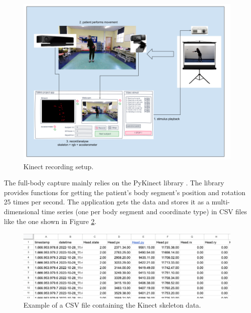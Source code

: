                     \begin{figure}[H]
                        \centering
                        \includegraphics[width=1.0\textwidth]{./resources/kinect/setup.png}
                        \caption{Kinect recording setup.}
                        \label{fig:kinect_setup}
                    \end{figure}
                    
                    The full-body capture mainly relies on the PyKinect library \cite{GitHubKinectPyKinect2}.
                    The library provides functions for getting the patient's body segment's position and rotation 25 times per second. The application gets the data and stores it as a multi-dimensional time series (one per body segment and coordinate type) in CSV files like the one shown in Figure \ref{fig:csv_structure}.

                    \begin{figure}[H]
                        \centering
                        \includegraphics[width=1.0\textwidth]{./resources/other/data.png}
                        \caption{Example of a CSV file containing the Kinect skeleton data.}
                        \label{fig:csv_structure}
                    \end{figure}

